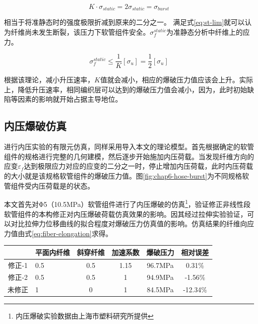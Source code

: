 \begin{equation}
K\cdot\sigma _{static}=2\sigma _{static}= \sigma _{burst}
\end{equation}

 相当于将准静态时的强度极限折减到原来的二分之一。
 满足式\ref{eq:st-lim}就可以认为纤维尚未发生断裂，该压力下软管组件安全。$ {\sigma _f^{static}} $为准静态分析中纤维上的应力。
 
\begin{equation}
\label{eq:st-lim}
{\sigma _f^{static}}  \le \frac{1}{K} \left[ {{\sigma _u}} \right] = \frac{1}{2} \left[ {{\sigma _u}} \right]
\end{equation}


根据该理论，减小升压速率，$ K $值就会减小，相应的爆破压力值应该会上升。实际上，降低升压速率，相同编织层可以达到的爆破压力值会减小，因为，此时初始缺陷等因素的影响就开始占据主导地位。


\subsection{内压爆破仿真}

进行内压实验的有限元仿真，同样采用\uma 导入本文的理论模型。首先根据确定的软管组件的规格进行完整的几何建模，然后逐步开始施加内压荷载。当发现纤维方向的应变$ \varepsilon_f $达到极限应力对应的应变的二分之一时，停止增加内压荷载，此时内压荷载的大小就是该规格软管组件的爆破压力值。图\ref{fig:chap6-hose-burst}为不同规格软管组件受内压荷载是的状态。



本文首先对Φ5（10.5MPa）软管组件进行了内压爆破的仿真\footnote{内压爆破实验数据由上海市塑料研究所提供}，验证修正非线性段软管组件的本构修正对内压爆破荷载仿真效果的影响。因其经过拉伸实验验证，可以对比拉伸力位移曲线的拟合程度对爆破压力仿真值的影响。仿真结果的纤维向应力值由式\ref{eq:fiber-elongation}求得。


\begin{table}[!htbp]
	\centering
	\label{tab:strength-of-hose-results}
	\begin{tabular}{@{\extracolsep{\fill}}>{\hspace{0.5cm}}clcccc}
		\toprule
		&平面内纤维&斜穿纤维&加速系数&爆破压力&相对误差\\\midrule
		修正-1&0.5&0.5&1.15&96.7MPa&0.31\%\\
		修正-2&0.5&0.5&1&94.9MPa&-1.56\%\\
		未修正&1&0&1&84.5MPa&-12.34\%\\
		\bottomrule
	\end{tabular} 
\end{table}  


